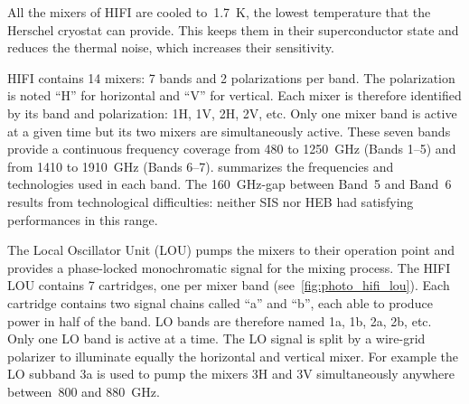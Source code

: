 All the mixers of HIFI are cooled to~\SI{1.7}{\kelvin}, the lowest temperature that the Herschel cryostat can provide.
This keeps them in their superconductor state and reduces the thermal noise, which increases their sensitivity.

HIFI contains 14 mixers: 7 bands and 2 polarizations per band.
The polarization is noted ``H'' for horizontal and ``V'' for vertical.
Each mixer is therefore identified by its band and polarization: 1H, 1V, 2H, 2V, etc.
Only one mixer band is active at a given time but its two mixers are simultaneously active.
These seven bands provide a continuous frequency coverage from \num{480} to \SI{1250}{\giga\hertz} (Bands 1--5) and from \num{1410} to \SI{1910}{\giga\hertz} (Bands 6--7).
 summarizes the frequencies and technologies used in each band.
The \SI{160}{\giga\hertz}-gap between Band~5 and Band~6 results from technological difficulties: neither SIS nor HEB had satisfying performances in this range.

The Local Oscillator Unit (LOU) pumps the mixers to their operation point and provides a phase-locked monochromatic signal for the mixing process.
The HIFI LOU contains 7 cartridges, one per mixer band (see~\cref{fig:photo_hifi_lou}).
Each cartridge contains two signal chains called ``a'' and ``b'', each able to produce power in half of the band.
LO bands are therefore named 1a, 1b, 2a, 2b, etc.
Only one LO band is active at a time.
The LO signal is split by a wire-grid polarizer to illuminate equally the horizontal and vertical mixer.
For example the LO subband 3a is used to pump the mixers 3H and 3V simultaneously anywhere between~\num{800} and \SI{880}{\giga\hertz}.

